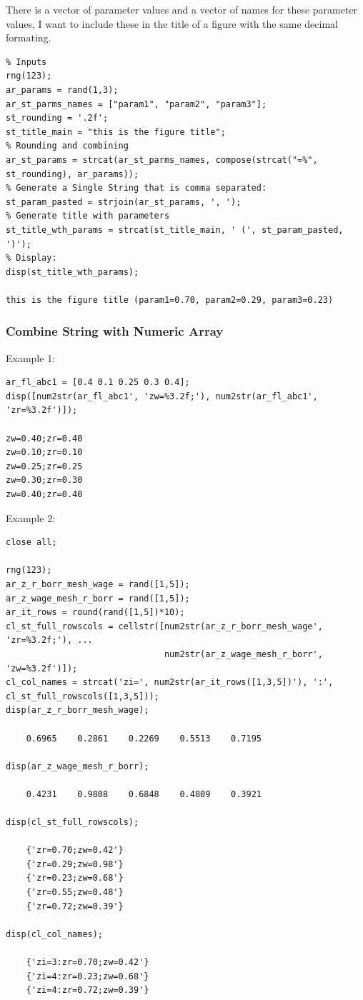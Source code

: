 \documentclass[
]{book}
\begin{document}
There is a vector of parameter values and a vector of names for these
parameter values, I want to include these in the title of a figure with
the same decimal formating.

\begin{verbatim}
% Inputs
rng(123);
ar_params = rand(1,3);
ar_st_parms_names = ["param1", "param2", "param3"];
st_rounding = '.2f';
st_title_main = "this is the figure title";
% Rounding and combining
ar_st_params = strcat(ar_st_parms_names, compose(strcat("=%", st_rounding), ar_params));
% Generate a Single String that is comma separated:
st_param_pasted = strjoin(ar_st_params, ', ');
% Generate title with parameters
st_title_wth_params = strcat(st_title_main, ' (', st_param_pasted, ')');
% Display:
disp(st_title_wth_params);

this is the figure title (param1=0.70, param2=0.29, param3=0.23)
\end{verbatim}

\hypertarget{combine-string-with-numeric-array}{%
\subsubsection{Combine String with Numeric Array}\label{combine-string-with-numeric-array}}

Example 1:

\begin{verbatim}
ar_fl_abc1 = [0.4 0.1 0.25 0.3 0.4];
disp([num2str(ar_fl_abc1', 'zw=%3.2f;'), num2str(ar_fl_abc1', 'zr=%3.2f')]);

zw=0.40;zr=0.40
zw=0.10;zr=0.10
zw=0.25;zr=0.25
zw=0.30;zr=0.30
zw=0.40;zr=0.40
\end{verbatim}

Example 2:

\begin{verbatim}
close all;

rng(123);
ar_z_r_borr_mesh_wage = rand([1,5]);
ar_z_wage_mesh_r_borr = rand([1,5]);
ar_it_rows = round(rand([1,5])*10);
cl_st_full_rowscols = cellstr([num2str(ar_z_r_borr_mesh_wage', 'zr=%3.2f;'), ...
                               num2str(ar_z_wage_mesh_r_borr', 'zw=%3.2f')]);
cl_col_names = strcat('zi=', num2str(ar_it_rows([1,3,5])'), ':', cl_st_full_rowscols([1,3,5]));
disp(ar_z_r_borr_mesh_wage);

    0.6965    0.2861    0.2269    0.5513    0.7195

disp(ar_z_wage_mesh_r_borr);

    0.4231    0.9808    0.6848    0.4809    0.3921

disp(cl_st_full_rowscols);

    {'zr=0.70;zw=0.42'}
    {'zr=0.29;zw=0.98'}
    {'zr=0.23;zw=0.68'}
    {'zr=0.55;zw=0.48'}
    {'zr=0.72;zw=0.39'}

disp(cl_col_names);

    {'zi=3:zr=0.70;zw=0.42'}
    {'zi=4:zr=0.23;zw=0.68'}
    {'zi=4:zr=0.72;zw=0.39'}
\end{verbatim}
\end{document}
